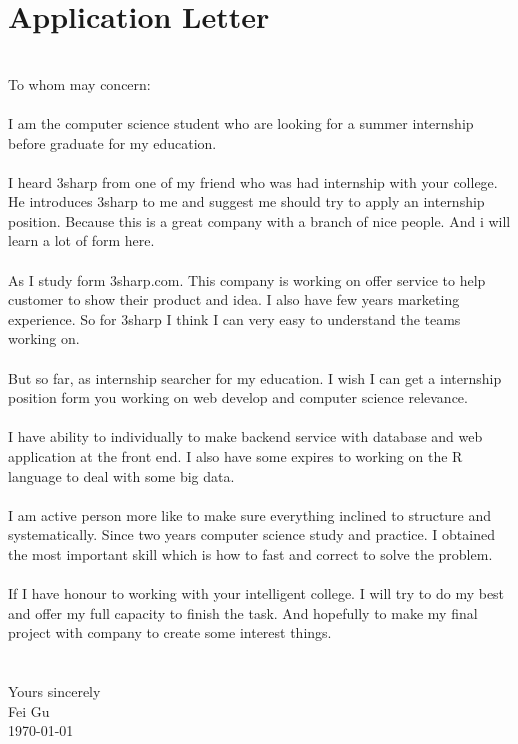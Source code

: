 \section{Application Letter}\label{sec:application-letter}
\newline
\\
To whom may concern:
\\
\paragraph{}
I am the computer science student who are looking for a summer internship before graduate
for my education.
\\
\paragraph{}
I heard 3sharp from one of my friend who was had internship with your college.
He introduces 3sharp to me and suggest me should try to apply an internship position.
Because this is a great company with a branch of nice people.
And i will learn a lot of form here.
\\
\paragraph{}
As I study form 3sharp.com.
This company is working on offer service to help customer to show their product and idea.
I also have few years marketing experience.
So for 3sharp I think I can very easy to understand the teams working on.
\\
\paragraph{}
But so far, as internship searcher for my education.
I wish I can get a internship position form you working on web develop and computer science relevance.
\\
\paragraph{}
I have ability to individually to make backend service with database and web application at the front end.
I also have some expires to working on the R language to deal with some big data.
\\
\paragraph{}
I am active person more like to make sure everything inclined to structure and systematically.
Since two years computer science study and practice.
I obtained the most important skill which is how to fast and correct to solve the problem.
\\
\paragraph{}
If I have honour to working with your intelligent college.
I will try to do my best and offer my full capacity to finish the task.
And hopefully to make my final project with company to create some interest things.
\\

\paragraph{}
\noindent \\
Yours sincerely\\
Fei Gu\\
\today